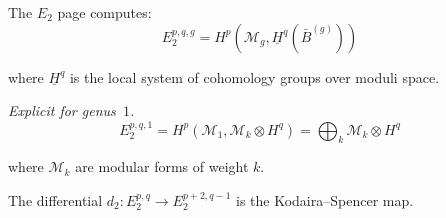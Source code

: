 \begin{theorem}
\label{thm:e2-page-complete}
The $E_2$ page computes:
\begin{equation}
E_2^{p,q,g} = H^p\left(\mathcal{M}_g, \underline{H}^q(\bar{B}^{(g)})\right)
\end{equation}

where $\underline{H}^q$ is the local system of cohomology groups over moduli space.

\emph{Explicit for genus~$1$.}
\begin{equation}
E_2^{p,q,1} = H^p(\mathcal{M}_1, \mathcal{M}_k \otimes H^q) = \bigoplus_{k} \mathcal{M}_k \otimes H^{q}
\end{equation}

where $\mathcal{M}_k$ are modular forms of weight $k$.

The differential $d_2: E_2^{p,q} \to E_2^{p+2,q-1}$ is the Kodaira--Spencer map.
\end{theorem}

